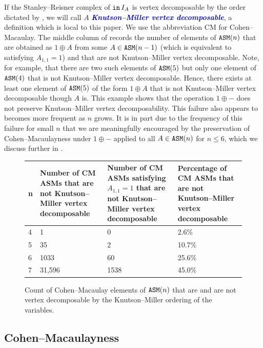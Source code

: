 \documentclass[12 pt]{amsart}
\DeclareMathOperator{\init}{{\tt in}}
\DeclareMathOperator{\asm}{\tt ASM}
\theoremstyle{plain}
\theoremstyle{definition}
\theoremstyle{remark}
\newcommand{\newword}[1]{\textcolor{darkblue}{\textbf{\emph{#1}}}}
\begin{document}
{If the Stanley--Reisner complex of $\init I_A$ is vertex decomposable by the order dictated by \cite{KM05}, we will call $A$ \newword{Knutson--Miller vertex decomposable}, a definition which is local to this paper.  We use the abbreviation CM for Cohen--Macaulay.
The middle column of  records the number of elements of $\asm(n)$ that are obtained as $1 \oplus A$ from some $A \in \asm(n-1)$ (which is equivalent to satisfying $A_{1,1} = 1$) and that are not Knutson--Miller vertex decomposable.  Note, for example, that there are two such elements of $\asm(5)$ but only one element of $\asm(4)$ that is not Knutson--Miller vertex decomposable.  Hence, there exists at least one element of $\asm(5)$ of the form $1 \oplus A$ that is not Knutson--Miller vertex decomposable though $A$ is.  This example shows that the operation $1 \oplus -$ does not preserve Knutson--Miller vertex decomposability. This failure also appears to becomes more frequent as $n$ grows.  It is in part due to the frequency of this failure for small $n$ that we are meaningfully encouraged by the preservation of Cohen--Macaulayness under $1 \oplus -$ applied to all $A \in \asm(n)$ for $n \leq 6$, which we discuss further in .

\begin{figure}[h]
\begin{center}
\begin{tabular}{ | m{.5em} | m{4.9cm}| m{4.9cm} | m{4.9cm} |} 
  \hline
  n & Number of CM ASMs that are not Knutson--Miller vertex decomposable & Number of CM ASMs satisfying $A_{1,1}=1$ that are not Knutson--Miller vertex decomposable & Percentage of CM ASMs that are not Knutson--Miller vertex decomposable\\ 
  \hline
  4 & 1 & 0 & 2.6\% \\
 \hline
 5 & 35 & 2 & 10.7\%\\
 \hline
 6 & 1033 & 60 & 25.6\%\\
  \hline
  7 & 31,596 & 1538 & 45.0\%\\
  \hline
\end{tabular}
\caption{Count of Cohen--Macaulay elements of $\asm(n)$ that are and are not vertex decomposable by the Knutson--Miller ordering of the variables.}
\label{KM-vert-decomp-table}
\end{center}
\end{figure}

\subsection{Cohen--Macaulayness}\label{sec:CM}

}
\end{document}
